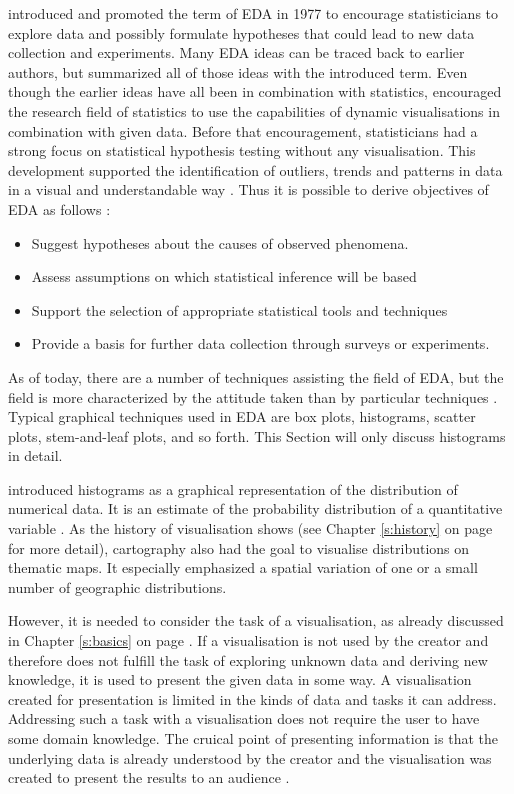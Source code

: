 \citeauthor{Tukey1977} introduced and promoted the term of \ac{EDA} in 1977 to encourage statisticians to explore data and possibly formulate hypotheses that could lead to new data collection and experiments. Many \ac{EDA} ideas can be traced back to earlier authors, but \citeauthor{Tukey1977} summarized all of those ideas with the introduced term. Even though the earlier ideas have all been in combination with statistics, \citeauthor{Tukey1977} encouraged the research field of statistics to use the capabilities of dynamic visualisations in combination with given data. Before that encouragement, statisticians had a strong focus on statistical hypothesis testing without any visualisation. This development supported the identification of outliers, trends and patterns in data in a visual and understandable way . Thus it is possible to derive objectives of \ac{EDA} as follows :

\begin{itemize}

\item Suggest hypotheses about the causes of observed phenomena.
\item Assess assumptions on which statistical inference will be based
\item Support the selection of appropriate statistical tools and techniques
\item Provide a basis for further data collection through surveys or experiments.

\end{itemize}

As of today, there are a number of techniques assisting the field of \ac{EDA}, but the field is more characterized by the attitude taken than by particular techniques . Typical graphical techniques used in \ac{EDA} are box plots, histograms, scatter plots, stem-and-leaf plots, and so forth. This Section will only discuss histograms in detail.

\citeauthor{Pearson1895} introduced histograms as a graphical representation of the distribution of numerical data. It is an estimate of the probability distribution of a quantitative variable . As the history of visualisation shows (see Chapter \ref{s:history} on page \pageref{s:history} for more detail), cartography also had the goal to visualise distributions on thematic maps. It especially emphasized a spatial variation of one or a small number of geographic distributions.

\cbstart
However, it is needed to consider the task of a visualisation, as already discussed in Chapter \ref{s:basics} on page \pageref{s:basics}. If a visualisation is not used by the creator and therefore does not fulfill the task of exploring unknown data and deriving new knowledge, it is used to present the given data in some way. A visualisation created for presentation is limited in the kinds of data and tasks it can address. Addressing such a task with a visualisation does not require the user to have some domain knowledge. The cruical point of presenting information is that the underlying data is already understood by the creator and the visualisation was created to present the results to an audience .
\cbend

